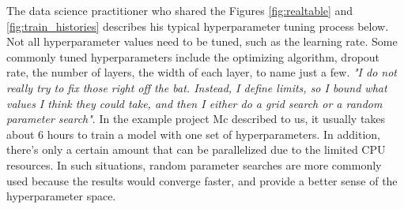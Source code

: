 \documentclass[preprint]{vgtc}        %
\begin{document}
The data science practitioner who shared the Figures \ref{fig:realtable} and \ref{fig:train_histories} describes his typical hyperparameter tuning process below. 
Not all hyperparameter values need to be tuned, such as the learning rate. Some commonly tuned hyperparameters include the optimizing algorithm, dropout rate, the number of layers, the width of each layer, to name just a few. \textit{"I do not really try to fix those right off the bat. Instead, I define limits, so I bound what values I think they could take, and then I either do a grid search or a random parameter search"}. In the example project Mc described to us, it usually takes about 6 hours to train a model with one set of hyperparameters. In addition, there's only a certain amount that can be parallelized due to the limited CPU resources. In such situations, random parameter searches are more commonly used because the results would converge faster, and provide a better sense of the hyperparameter space.
\end{document}
